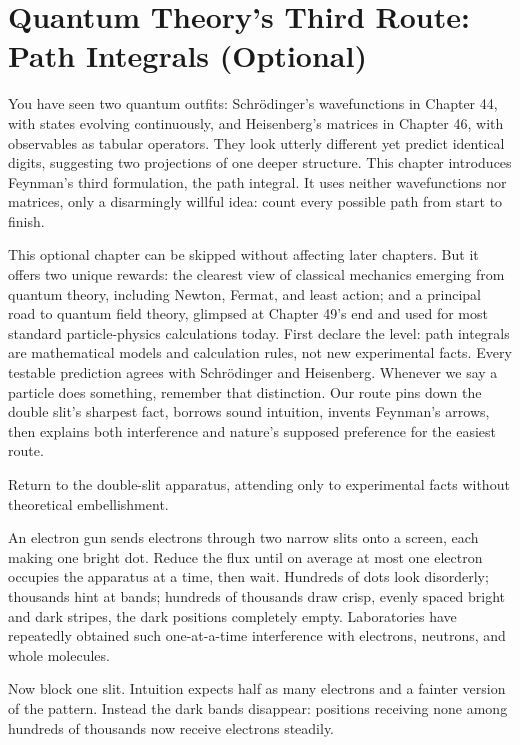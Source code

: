 \chapter[Path Integrals (Optional)]{Quantum Theory's Third Route: Path Integrals (Optional)}

You have seen two quantum outfits: Schrödinger's wavefunctions in Chapter 44, with states evolving continuously, and Heisenberg's matrices in Chapter 46, with observables as tabular operators. They look utterly different yet predict identical digits, suggesting two projections of one deeper structure. This chapter introduces Feynman's third formulation, the path integral. It uses neither wavefunctions nor matrices, only a disarmingly willful idea: count every possible path from start to finish.

This optional chapter can be skipped without affecting later chapters. But it offers two unique rewards: the clearest view of classical mechanics emerging from quantum theory, including Newton, Fermat, and least action; and a principal road to quantum field theory, glimpsed at Chapter 49's end and used for most standard particle-physics calculations today. First declare the level: path integrals are mathematical models and calculation rules, not new experimental facts. Every testable prediction agrees with Schrödinger and Heisenberg. Whenever we say a particle does something, remember that distinction. Our route pins down the double slit's sharpest fact, borrows sound intuition, invents Feynman's arrows, then explains both interference and nature's supposed preference for the easiest route.


Return to the double-slit apparatus, attending only to experimental facts without theoretical embellishment.

An electron gun sends electrons through two narrow slits onto a screen, each making one bright dot. Reduce the flux until on average at most one electron occupies the apparatus at a time, then wait. Hundreds of dots look disorderly; thousands hint at bands; hundreds of thousands draw crisp, evenly spaced bright and dark stripes, the dark positions completely empty. Laboratories have repeatedly obtained such one-at-a-time interference with electrons, neutrons, and whole molecules.

Now block one slit. Intuition expects half as many electrons and a fainter version of the pattern. Instead the dark bands disappear: positions receiving none among hundreds of thousands now receive electrons steadily.

